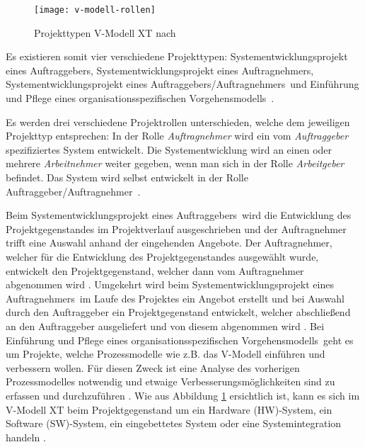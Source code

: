 \begin{figure}[htp]
\begin{center}
  \texttt{[image: v-modell-rollen]} %
  \caption{Projekttypen V-Modell XT nach \cite{2004vmodell}}
  \label{fig:Projekttypen}
\end{center}
\end{figure}

Es existieren somit vier verschiedene Projekttypen: \grqq Systementwicklungsprojekt eines Auftraggebers\grqq, \grqq Systementwicklungsprojekt eines Auftragnehmers\grqq, \grqq Systementwicklungsprojekt eines Auftraggebers/Auftragnehmers\grqq \ und \grqq Einführung und Pflege eines organisationsspezifischen Vorgehensmodells\grqq \ \cite{reinhard2008}. \newline

Es werden drei verschiedene Projektrollen unterschieden, welche dem jeweiligen Projekttyp entsprechen: In der Rolle \textit{Auftragnehmer} wird ein vom \textit{Auftraggeber} spezifiziertes System entwickelt. Die Systementwicklung wird an einen oder mehrere \textit{Arbeitnehmer} weiter gegeben, wenn man sich in der Rolle \textit{Arbeitgeber} befindet. Das System  wird selbst entwickelt in der Rolle \grqq Auftraggeber/Auftragnehmer\grqq \ \cite{brack2010,2004vmodell}.\newline


Beim \grqq Systementwicklungsprojekt eines Auftraggebers\grqq \ wird die Entwicklung des Projektgegenstandes im Projektverlauf  ausgeschrieben und der Auftragnehmer trifft eine Auswahl anhand der eingehenden Angebote. Der Auftragnehmer, welcher für die Entwicklung des Projektgegenstandes ausgewählt wurde, entwickelt den Projektgegenstand, welcher dann vom Auftragnehmer abgenommen wird \cite{reinhard2008,2004vmodell}.\newline
Umgekehrt wird beim \grqq Systementwicklungsprojekt eines Auftragnehmers\grqq \ im Laufe des Projektes ein Angebot erstellt und bei Auswahl durch den Auftraggeber ein Projektgegenstand entwickelt, welcher abschließend an den Auftraggeber ausgeliefert und von diesem abgenommen wird \cite{reinhard2008,2004vmodell}.\newline
Bei \grqq Einführung und Pflege eines organisationsspezifischen Vorgehensmodells\grqq \ geht es um Projekte, welche Prozessmodelle wie z.B. das V-Modell einführen und verbessern wollen. Für diesen Zweck ist eine Analyse des vorherigen Prozessmodelles notwendig und etwaige Verbesserungsmöglichkeiten sind zu erfassen und durchzuführen \cite{reinhard2008,2004vmodell}.\newline
Wie aus Abbildung \ref{fig:Projekttypen} ersichtlich ist, kann es sich im V-Modell XT beim Projektgegenstand um ein Hardware (HW)-System, ein Software (SW)-System, ein eingebettetes System oder eine Systemintegration handeln \cite{brack2010,2004vmodell}. \newline

